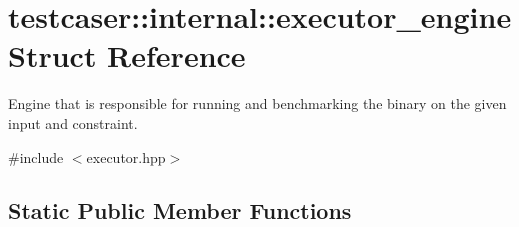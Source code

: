 \hypertarget{structtestcaser_1_1internal_1_1executor__engine}{}\section{testcaser\+:\+:internal\+:\+:executor\+\_\+engine Struct Reference}
\label{structtestcaser_1_1internal_1_1executor__engine}


Engine that is responsible for running and benchmarking the binary on the given input and constraint.  




{\ttfamily \#include $<$executor.\+hpp$>$}

\subsection*{Static Public Member Functions}
